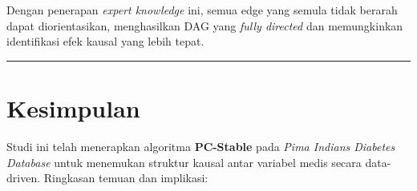 \documentclass[
  11pt,
]{article}
\begin{document}
Dengan penerapan \emph{expert knowledge} ini, semua edge yang semula
tidak berarah dapat diorientasikan, menghasilkan DAG yang \emph{fully
directed} dan memungkinkan identifikasi efek kausal yang lebih tepat.

\begin{center}\rule{0.5\linewidth}{0.5pt}\end{center}

\section{Kesimpulan}\label{kesimpulan}

Studi ini telah menerapkan algoritma \textbf{PC-Stable} pada \emph{Pima
Indians Diabetes Database} untuk menemukan struktur kausal antar
variabel medis secara data-driven. Ringkasan temuan dan implikasi:
\end{document}
